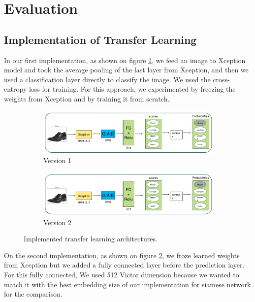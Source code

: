 \section{Evaluation}

\subsection{Implementation of Transfer Learning}
In our first implementation, as shown on figure \ref {fig:xceptiona}, we feed an image to Xception model and took the average pooling of the last layer from Xception, and then we used a classification layer directly to classify the image. We used the cross-entropy loss for training. For this approach, we experimented by freezing the weights from Xception and by training it from scratch. 

\begin{figure}[h]
 \centering
  \begin{subfigure}[b]{\linewidth}
 \includegraphics[width=\linewidth]{figs/xception_1.png}
  \caption{Version 1}
  \label{fig:xceptiona}
  \end{subfigure}
    \hfill
  \begin{subfigure}[b]{\linewidth}
 \includegraphics[width=\linewidth]{figs/xception_1.png}
 \caption{Version 2}
  \label{fig:xceptionb}
  \end{subfigure}
    \hfill    
 \caption{Implemented transfer learning architectures.}
 \label{fig:xception}
\end{figure}

On the second implementation, as shown on figure \ref{fig:xceptionb}, we froze learned weights from Xception but we added a fully connected layer before the prediction layer. For this fully connected, We used 512 Victor dimension because we wanted to match it with the best embedding size of our implementation for siamese network for the comparison. 

